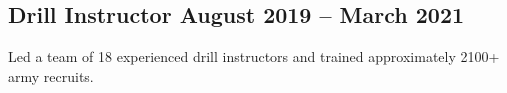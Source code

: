 \subsection{{Drill Instructor \hfill August 2019 – March 2021}}
\begin{zitemize}

\item Led a team of 18 experienced drill instructors and trained approximately 2100+ army recruits.

\end{zitemize}
